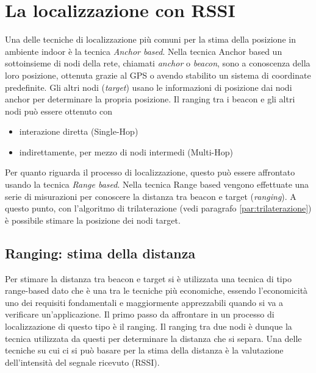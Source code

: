 
\chapter{La localizzazione con RSSI}
\label{cap:localizzazione-con-rssi}

Una delle tecniche di localizzazione più comuni per la stima della posizione in ambiente indoor è la tecnica \emph{Anchor based}. Nella tecnica Anchor based un sottoinsieme di nodi della rete, chiamati \emph{anchor} o \emph{beacon}, sono a conoscenza della loro posizione, ottenuta grazie al GPS o avendo stabilito un sistema di coordinate predefinite. Gli altri nodi (\emph{target}) usano le informazioni di posizione dai nodi anchor per determinare la propria posizione. Il ranging tra i beacon e gli altri nodi può essere ottenuto con
\begin{itemize}
	
	\item
	interazione diretta (Single-Hop)
	
	\item 
	indirettamente, per mezzo di nodi intermedi (Multi-Hop)
	
\end{itemize}
Per quanto riguarda il processo di localizzazione, questo può essere affrontato usando la tecnica \emph{Range based}. Nella tecnica Range based vengono effettuate una serie di misurazioni per conoscere la distanza tra beacon e target (\emph{ranging}). A questo punto, con l’algoritmo di trilaterazione (vedi paragrafo \ref{par:trilaterazione}) è possibile stimare la posizione dei nodi target.

\section{Ranging: stima della distanza}
\label{par:ranging}
Per stimare la distanza tra beacon e target si è utilizzata una tecnica di tipo range-based dato che è una tra le tecniche più economiche, essendo l'economicità uno dei requisiti fondamentali e maggiormente apprezzabili quando si va a verificare un'applicazione.
Il primo passo da affrontare in un processo di localizzazione di questo tipo è il ranging.
Il ranging tra due nodi è dunque la tecnica utilizzata da questi per determinare la distanza che si separa. Una delle tecniche su cui ci si può basare per la stima della distanza è la valutazione dell'intensità del segnale ricevuto (RSSI).

